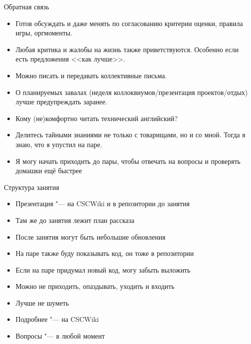 \begin{frame}[t]{Обратная связь}
	\begin{itemize}
		\item
			Готов обсуждать и даже менять по согласованию критерии оценки, правила игры, оргмоменты.
		\item
			Любая критика и жалобы на жизнь также приветствуются.
			Особенно если есть предложения <<как лучше>>.
		\item
			Можно писать и передавать коллективные письма.
		\item
			О планируемых завалах (неделя коллоквиумов/презентация проектов/отдых) лучше предупреждать заранее.
		\item
			Кому (не)комфортно читать технический английский?
		\item
			Делитесь тайными знаниями не только с товарищами, но и со мной.
			Тогда я знаю, что я упустил на паре.
		\item Я могу начать приходить до пары, чтобы отвечать на вопросы и проверять домашки ещё быстрее
	\end{itemize}
\end{frame}

\begin{frame}[t]{Структура занятия}
	\begin{itemize}
		\item Презентация "--- на CSCWiki и в репозитории до занятия
		\item Там же до занятия лежит план рассказа
		\item После занятия могут быть небольшие обновления
		\item На паре также буду показывать код, он тоже в репозитории
		\item Если на паре придумал новый код, могу забыть выложить
		\item Можно не приходить, опаздывать, уходить и входить
		\item Лучше не шуметь
		\item Подробнее "--- на CSCWiki
		\item Вопросы "--- в любой момент
	\end{itemize}
\end{frame}
